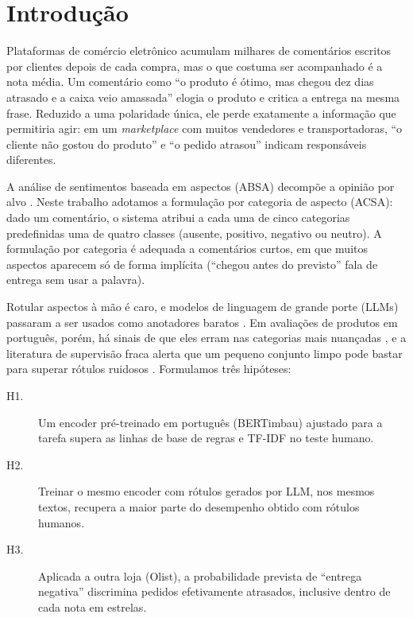 \documentclass[12pt,a4paper]{article}
\begin{document}
\section{Introdução}

Plataformas de comércio eletrônico acumulam milhares de comentários escritos por clientes depois de cada compra, mas o que costuma ser acompanhado é a nota média. Um comentário como ``o produto é ótimo, mas chegou dez dias atrasado e a caixa veio amassada'' elogia o produto e critica a entrega na mesma frase. Reduzido a uma polaridade única, ele perde exatamente a informação que permitiria agir: em um \emph{marketplace} com muitos vendedores e transportadoras, ``o cliente não gostou do produto'' e ``o pedido atrasou'' indicam responsáveis diferentes.

A análise de sentimentos baseada em aspectos (ABSA) decompõe a opinião por alvo \citep{pontiki2014semeval,zhang2023survey}. Neste trabalho adotamos a formulação por categoria de aspecto (ACSA): dado um comentário, o sistema atribui a cada uma de cinco categorias predefinidas uma de quatro classes (ausente, positivo, negativo ou neutro). A formulação por categoria é adequada a comentários curtos, em que muitos aspectos aparecem só de forma implícita (``chegou antes do previsto'' fala de entrega sem usar a palavra).

Rotular aspectos à mão é caro, e modelos de linguagem de grande porte (LLMs) passaram a ser usados como anotadores baratos \citep{gilardi2023chatgpt,wang2021labeling}. Em avaliações de produtos em português, porém, há sinais de que eles erram nas categorias mais nuançadas \citep{silva2024sabia}, e a literatura de supervisão fraca alerta que um pequeno conjunto limpo pode bastar para superar rótulos ruidosos \citep{zhu2023weaker}. Formulamos três hipóteses:

\begin{description}
  \item[H1.] Um encoder pré-treinado em português (BERTimbau) ajustado para a tarefa supera as linhas de base de regras e TF-IDF no teste humano.
  \item[H2.] Treinar o mesmo encoder com rótulos gerados por LLM, nos mesmos textos, recupera a maior parte do desempenho obtido com rótulos humanos.
  \item[H3.] Aplicada a outra loja (Olist), a probabilidade prevista de ``entrega negativa'' discrimina pedidos efetivamente atrasados, inclusive dentro de cada nota em estrelas.
\end{description}
\end{document}

